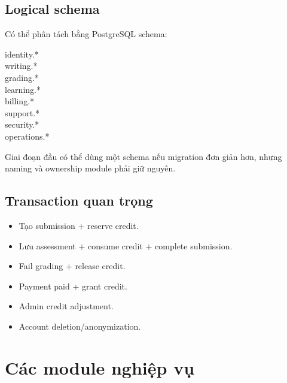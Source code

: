 \documentclass[11pt,a4paper]{article}
\begin{document}
\subsection{Logical schema}
Có thể phân tách bằng PostgreSQL schema:
\begin{codebox}
identity.*\\
writing.*\\
grading.*\\
learning.*\\
billing.*\\
support.*\\
security.*\\
operations.*
\end{codebox}
Giai đoạn đầu có thể dùng một schema nếu migration đơn giản hơn, nhưng naming và ownership module phải giữ nguyên.

\subsection{Transaction quan trọng}
\begin{itemize}
  \item Tạo submission + reserve credit.
  \item Lưu assessment + consume credit + complete submission.
  \item Fail grading + release credit.
  \item Payment paid + grant credit.
  \item Admin credit adjustment.
  \item Account deletion/anonymization.
\end{itemize}

\section{Các module nghiệp vụ}
\end{document}
